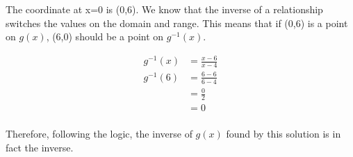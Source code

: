 \documentclass[12pt]{book}
\begin{document}
\begin{enumerate}
The coordinate at x=0 is (0,6). We know that the inverse of a relationship switches the values on the domain and range.
This means that if (0,6) is a point on $g(x)$, (6,0) should be a point on $g^{-1}(x)$.

\begin{align*}
    g^{-1}(x) &= \frac{x-6}{x-4} \\
    g^{-1}(6) &= \frac{6-6}{6-4} \\
    &= \frac{0}{2} \\
    &= 0 \\
\end{align*}
\vspace{-3em}

Therefore, following the logic, the inverse of $g(x)$ found by this solution is in fact the inverse.
\newpage

\end{enumerate}
\end{document}
